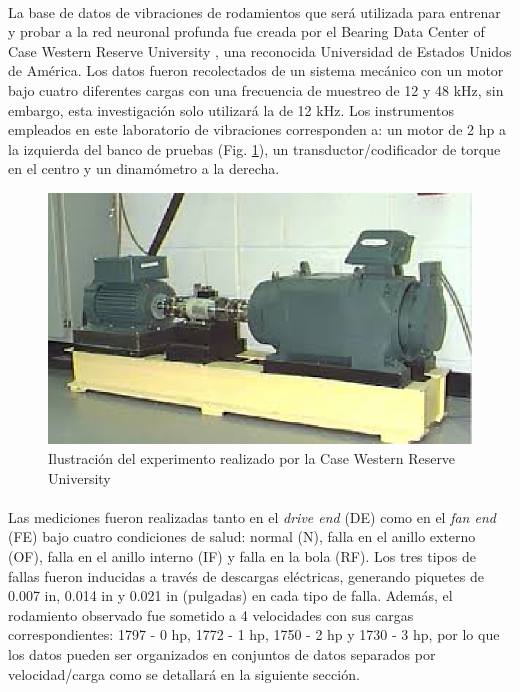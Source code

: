 \documentclass[12pt]{article}%
\begin{document}
\paragraph{}
La base de datos de vibraciones de rodamientos que será utilizada para entrenar y probar a la red neuronal profunda fue creada por el Bearing Data Center of Case Western Reserve University \cite{case}, una reconocida Universidad de Estados Unidos de América. Los datos fueron recolectados de un sistema mecánico con un motor bajo cuatro diferentes cargas con una frecuencia de muestreo de 12 y 48 kHz, sin embargo, esta investigación solo utilizará la de 12 kHz. Los instrumentos empleados en este laboratorio de vibraciones corresponden a: un motor de 2 hp a la izquierda del banco de pruebas (Fig. \ref{fig:bearing}), un transductor/codificador de torque en el centro y un dinamómetro a la derecha.

\begin{figure}[ht]
  \centering
    \includegraphics[scale=0.8]{./bearing.eps}
  \caption{Ilustración del experimento realizado por la Case Western Reserve University \cite{case}}
  \label{fig:bearing}
\end{figure}

\paragraph{}
Las mediciones fueron realizadas tanto en el \textit{drive end} (DE) como en el \textit{fan end} (FE) bajo cuatro condiciones de salud: normal (N), falla en el anillo externo (OF), falla en el anillo interno (IF) y falla en la bola (RF). Los tres tipos de fallas fueron inducidas a través de descargas eléctricas, generando piquetes de 0.007 in, 0.014 in y 0.021 in (pulgadas) en cada tipo de falla. Además, el rodamiento observado fue sometido a 4 velocidades con sus cargas correspondientes: 1797 - 0 hp, 1772 - 1 hp, 1750 - 2 hp y 1730 - 3 hp, por lo que los datos pueden ser organizados en conjuntos de datos separados por velocidad/carga como se detallará en la siguiente sección.
\end{document}
